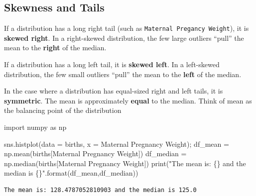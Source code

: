 \documentclass[
  letterpaper,
  DIV=11,
  numbers=noendperiod]{scrreprt}
\newenvironment{Shaded}{\begin{snugshade}}{\end{snugshade}}
\newcommand{\BuiltInTok}[1]{\textcolor[rgb]{0.00,0.23,0.31}{#1}}
\newcommand{\ImportTok}[1]{\textcolor[rgb]{0.00,0.46,0.62}{#1}}
\newcommand{\NormalTok}[1]{\textcolor[rgb]{0.00,0.23,0.31}{#1}}
\newcommand{\OperatorTok}[1]{\textcolor[rgb]{0.37,0.37,0.37}{#1}}
\newcommand{\SpecialCharTok}[1]{\textcolor[rgb]{0.37,0.37,0.37}{#1}}
\newcommand{\StringTok}[1]{\textcolor[rgb]{0.13,0.47,0.30}{#1}}
\begin{document}
\hypertarget{skewness-and-tails}{%
\subsection{Skewness and Tails}\label{skewness-and-tails}}

If a distribution has a long right tail (such as
\texttt{Maternal\ Pregancy\ Weight}), it is \textbf{skewed right}. In a
right-skewed distribution, the few large outliers ``pull'' the mean to
the \textbf{right} of the median.

If a distribution has a long left tail, it is \textbf{skewed left}. In a
left-skewed distribution, the few small outliers ``pull'' the mean to
the \textbf{left} of the median.

In the case where a distribution has equal-sized right and left tails,
it is \textbf{symmetric}. The mean is approximately \textbf{equal} to
the median. Think of mean as the balancing point of the distribution

\begin{Shaded}
\begin{Highlighting}[]
\ImportTok{import}\NormalTok{ numpy }\ImportTok{as}\NormalTok{ np}

\NormalTok{sns.histplot(data }\OperatorTok{=}\NormalTok{ births, x }\OperatorTok{=} \StringTok{\textquotesingle{}Maternal Pregnancy Weight\textquotesingle{}}\NormalTok{)}\OperatorTok{;}
\NormalTok{df\_mean }\OperatorTok{=}\NormalTok{ np.mean(births[}\StringTok{\textquotesingle{}Maternal Pregnancy Weight\textquotesingle{}}\NormalTok{])}
\NormalTok{df\_median }\OperatorTok{=}\NormalTok{ np.median(births[}\StringTok{\textquotesingle{}Maternal Pregnancy Weight\textquotesingle{}}\NormalTok{])}
\BuiltInTok{print}\NormalTok{(}\StringTok{"The mean is: }\SpecialCharTok{\{\}}\StringTok{ and the median is }\SpecialCharTok{\{\}}\StringTok{"}\NormalTok{.}\BuiltInTok{format}\NormalTok{(df\_mean,df\_median))}
\end{Highlighting}
\end{Shaded}

\begin{verbatim}
The mean is: 128.4787052810903 and the median is 125.0
\end{verbatim}
\end{document}
